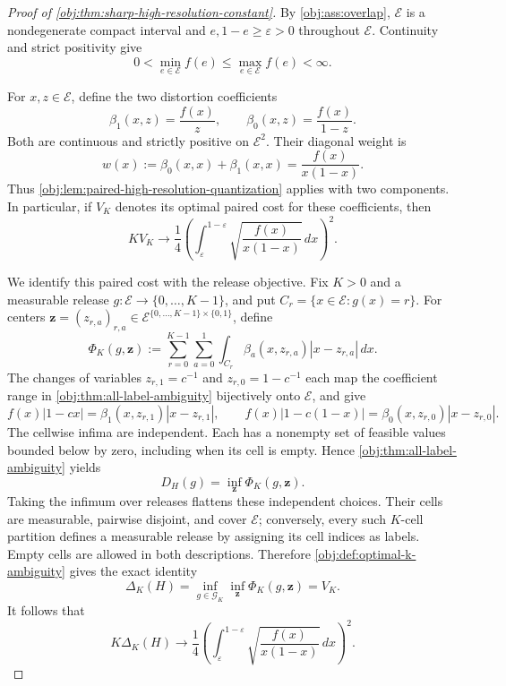 \begin{proof}[Proof of \cref{obj:thm:sharp-high-resolution-constant}]
By \cref{obj:ass:overlap}, \(\mathcal E\) is a nondegenerate compact interval and \(e,1-e\geq\varepsilon>0\) throughout \(\mathcal E\). Continuity and strict positivity give
\[
0<\min_{e\in\mathcal E}f(e)
\leq\max_{e\in\mathcal E}f(e)<\infty.
\]

For \(x,z\in\mathcal E\), define the two distortion coefficients
\[
\beta_1(x,z)=\frac{f(x)}{z},
\qquad
\beta_0(x,z)=\frac{f(x)}{1-z}.
\]
Both are continuous and strictly positive on \(\mathcal E^2\). Their diagonal weight is
\[
w(x):=\beta_0(x,x)+\beta_1(x,x)
=\frac{f(x)}{x(1-x)}.
\]
Thus \cref{obj:lem:paired-high-resolution-quantization} applies with two components. In particular, if \(V_K\) denotes its optimal paired cost for these coefficients, then
\[
K V_K\longrightarrow
\frac14\left(\int_{\varepsilon}^{1-\varepsilon}
\sqrt{\frac{f(x)}{x(1-x)}}\,dx\right)^2.
\]

We identify this paired cost with the release objective. Fix \(K>0\) and a measurable release \(g:\mathcal E\to\{0,\ldots,K-1\}\), and put \(C_r=\{x\in\mathcal E:g(x)=r\}\). For centers \(\mathbf z=(z_{r,a})_{r,a}\in\mathcal E^{\{0,\ldots,K-1\}\times\{0,1\}}\), define
\[
\Phi_K(g,\mathbf z)
:=
\sum_{r=0}^{K-1}\sum_{a=0}^{1}
\int_{C_r}\beta_a(x,z_{r,a})|x-z_{r,a}|\,dx.
\]
The changes of variables \(z_{r,1}=c^{-1}\) and \(z_{r,0}=1-c^{-1}\) each map the coefficient range in \cref{obj:thm:all-label-ambiguity} bijectively onto \(\mathcal E\), and give
\[
f(x)|1-cx|
=\beta_1(x,z_{r,1})|x-z_{r,1}|,
\qquad
f(x)|1-c(1-x)|
=\beta_0(x,z_{r,0})|x-z_{r,0}|.
\]
The cellwise infima are independent. Each has a nonempty set of feasible values bounded below by zero, including when its cell is empty. Hence \cref{obj:thm:all-label-ambiguity} yields
\[
D_H(g)=\inf_{\mathbf z}\Phi_K(g,\mathbf z).
\]
Taking the infimum over releases flattens these independent choices. Their cells are measurable, pairwise disjoint, and cover \(\mathcal E\); conversely, every such \(K\)-cell partition defines a measurable release by assigning its cell indices as labels. Empty cells are allowed in both descriptions. Therefore \cref{obj:def:optimal-k-ambiguity} gives the exact identity
\[
\Delta_K(H)
=\inf_{g\in\mathcal G_K}\inf_{\mathbf z}\Phi_K(g,\mathbf z)
=V_K.
\]
It follows that
\[
K\Delta_K(H)\longrightarrow
\frac14\left(\int_{\varepsilon}^{1-\varepsilon}
\sqrt{\frac{f(x)}{x(1-x)}}\,dx\right)^2.
\]


\end{proof}
